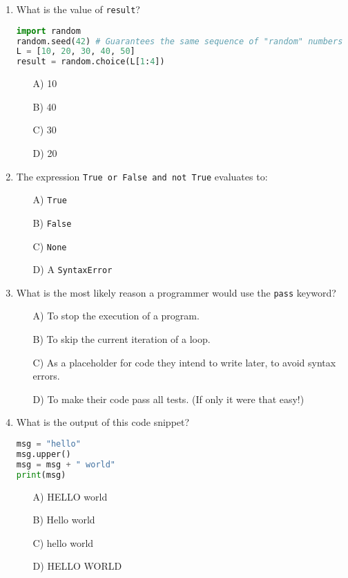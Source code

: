\documentclass[9pt]{article}
\begin{document}
\begin{multicols}{2}
\begin{enumerate}
\item What is the value of \texttt{result}?
\begin{lstlisting}[language=Python]
import random
random.seed(42) # Guarantees the same sequence of "random" numbers
L = [10, 20, 30, 40, 50]
result = random.choice(L[1:4])
\end{lstlisting}
\begin{enumerate}
\item[A)] 10
\item[B)] 40
\item[C)] 30
\item[D)] 20
\end{enumerate}

\item The expression \texttt{True or False and not True} evaluates to:
\begin{enumerate}
    \item[A)] \texttt{True}
    \item[B)] \texttt{False}
    \item[C)] \texttt{None}
    \item[D)] A \texttt{SyntaxError}
\end{enumerate}

\item What is the most likely reason a programmer would use the \texttt{pass} keyword?
\begin{enumerate}
    \item[A)] To stop the execution of a program.
    \item[B)] To skip the current iteration of a loop.
    \item[C)] As a placeholder for code they intend to write later, to avoid syntax errors.
    \item[D)] To make their code pass all tests. (If only it were that easy!)
\end{enumerate}

\item What is the output of this code snippet?
\begin{lstlisting}[language=Python]
msg = "hello"
msg.upper()
msg = msg + " world"
print(msg)
\end{lstlisting}
\begin{enumerate}
\item[A)] HELLO world
\item[B)] Hello world
\item[C)] hello world
\item[D)] HELLO WORLD
\end{enumerate}


\end{enumerate}
\end{multicols}
\end{document}
